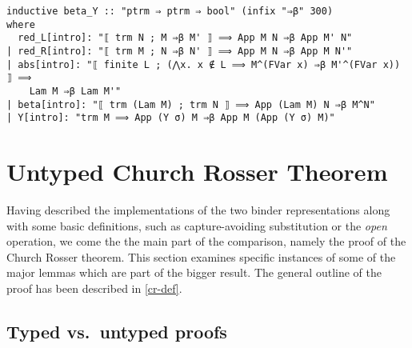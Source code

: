 \documentclass[a4paper, 12pt, twoside]{style/ociamthesis}
\theoremstyle{plain}
\theoremstyle{definition}
\theoremstyle{remark}
\begin{document}
\begin{verbatim}
inductive beta_Y :: "ptrm ⇒ ptrm ⇒ bool" (infix "⇒β" 300)
where
  red_L[intro]: "⟦ trm N ; M ⇒β M' ⟧ ⟹ App M N ⇒β App M' N"
| red_R[intro]: "⟦ trm M ; N ⇒β N' ⟧ ⟹ App M N ⇒β App M N'"
| abs[intro]: "⟦ finite L ; (⋀x. x ∉ L ⟹ M^(FVar x) ⇒β M'^(FVar x)) ⟧ ⟹ 
    Lam M ⇒β Lam M'"
| beta[intro]: "⟦ trm (Lam M) ; trm N ⟧ ⟹ App (Lam M) N ⇒β M^N"
| Y[intro]: "trm M ⟹ App (Y σ) M ⇒β App M (App (Y σ) M)"
\end{verbatim}

\section{Untyped Church Rosser
Theorem}\label{untyped-church-rosser-theorem}

Having described the implementations of the two binder representations
along with some basic definitions, such as capture-avoiding substitution
or the \emph{open} operation, we come the the main part of the
comparison, namely the proof of the Church Rosser theorem. This section
examines specific instances of some of the major lemmas which are part
of the bigger result. The general outline of the proof has been
described in \cref{cr-def}.

\subsection{Typed vs.~untyped proofs}\label{typ-utyp}

\label{utypReason}
\end{document}
